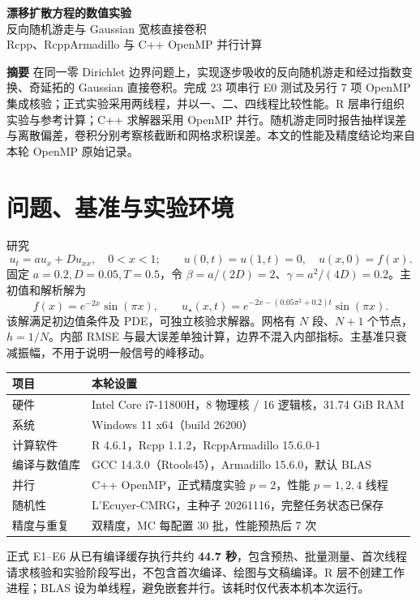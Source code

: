\documentclass[UTF8,10.5pt,a4paper]{ctexart}
\begin{document}
\begin{center}{\LARGE\bfseries 漂移扩散方程的数值实验}\\[.5em]
{\large 反向随机游走与 Gaussian 宽核直接卷积}\\[.5em]
Rcpp、RcppArmadillo 与 C++ OpenMP 并行计算
\end{center}
\noindent\textbf{摘要}\quad
在同一零 Dirichlet 边界问题上，实现逐步吸收的反向随机游走和经过指数变换、奇延拓的 Gaussian 直接卷积。完成 23 项串行 E0 测试及另行 7 项 OpenMP 集成核验；正式实验采用两线程，并以一、二、四线程比较性能。R 层串行组织实验与参考计算；C++ 求解器采用 OpenMP 并行。随机游走同时报告抽样误差与离散偏差，卷积分别考察核截断和网格求积误差。本文的性能及精度结论均来自本轮 OpenMP 原始记录。

\section{问题、基准与实验环境}
研究
\[
u_t=a u_x+D u_{xx},\quad 0<x<1;\qquad
u(0,t)=u(1,t)=0,\quad u(x,0)=f(x).
\]
固定 $a=0.2,D=0.05,T=0.5$，令 $\beta=a/(2D)=2$、$\gamma=a^2/(4D)=0.2$。主初值和解析解为
\[
f(x)=e^{-2x}\sin(\pi x),\qquad
u_\star(x,t)=e^{-2x-(0.05\pi^2+0.2)t}\sin(\pi x).
\]
该解满足初边值条件及 PDE，可独立核验求解器。网格有 $N$ 段、$N+1$ 个节点，$h=1/N$。内部 RMSE 与最大误差单独计算，边界不混入内部指标。主基准只衰减振幅，不用于说明一般信号的峰移动。
\begin{center}\small
\begin{tabular}{ll}\toprule
项目 & 本轮设置\\\midrule
硬件 & Intel Core i7-11800H，8 物理核 / 16 逻辑核，31.74 GiB RAM\\
系统 & Windows 11 x64（build 26200）\\
计算软件 & R 4.6.1，Rcpp 1.1.2，RcppArmadillo 15.6.0-1\\
编译与数值库 & GCC 14.3.0（Rtools45），Armadillo 15.6.0，默认 BLAS\\
并行 & C++ OpenMP，正式精度实验 $p=2$，性能 $p=1,2,4$ 线程\\
随机性 & L'Ecuyer-CMRG，主种子 20261116，完整任务状态已保存\\
精度与重复 & 双精度，MC 每配置 30 批，性能预热后 7 次\\\bottomrule
\end{tabular}
\end{center}
正式 E1--E6 从已有编译缓存执行共约 \textbf{44.7 秒}，包含预热、批量测量、首次线程请求核验和实验阶段写出，不包含首次编译、绘图与文稿编译。R 层不创建工作进程；BLAS 设为单线程，避免嵌套并行。该耗时仅代表本机本次运行。
\newpage
\end{document}
